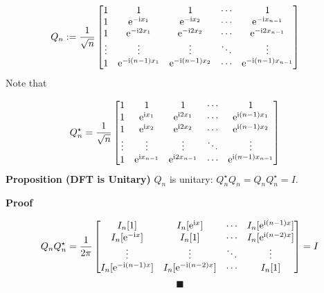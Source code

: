 \documentclass[12pt,a4paper]{article}
\begin{document}
\begin{align*}
Q_n &:= {1 \over \sqrt{n}} \begin{bmatrix} 1 & 1 & 1&  \ensuremath{\cdots} & 1 \\
                                    1 & {\rm e}^{-{\rm i} x_1} & {\rm e}^{-{\rm i} x_2} & \ensuremath{\cdots} & {\rm e}^{-{\rm i} x_{n-1}} \\
                                    1 & {\rm e}^{-{\rm i} 2 x_1} & {\rm e}^{-{\rm i} 2 x_2} & \ensuremath{\cdots} & {\rm e}^{-{\rm i} 2x_{n-1}} \\
                                    \ensuremath{\vdots} & \ensuremath{\vdots} & \ensuremath{\vdots} & \ensuremath{\ddots} & \ensuremath{\vdots} \\
                                    1 & {\rm e}^{-{\rm i} (n-1) x_1} & {\rm e}^{-{\rm i} (n-1) x_2} & \ensuremath{\cdots} & {\rm e}^{-{\rm i} (n-1) x_{n-1}}
\end{bmatrix} 
\end{align*}
Note that


\begin{align*}
Q_n^\ensuremath{\star} &= {1 \over \sqrt{n}} \begin{bmatrix}
1 & 1 & 1&  \ensuremath{\cdots} & 1 \\
1 & {\rm e}^{{\rm i} x_1} & {\rm e}^{{\rm i} 2 x_1} & \ensuremath{\cdots} & {\rm e}^{{\rm i} (n-1) x_1} \\
1 &  {\rm e}^{{\rm i} x_2}  & {\rm e}^{{\rm i} 2 x_2} & \ensuremath{\cdots} & {\rm e}^{{\rm i} (n-1)x_2} \\
\ensuremath{\vdots} & \ensuremath{\vdots} & \ensuremath{\vdots} & \ensuremath{\ddots} & \ensuremath{\vdots} \\
1 & {\rm e}^{{\rm i} x_{n-1}} & {\rm e}^{{\rm i} 2 x_{n-1}} & \ensuremath{\cdots} & {\rm e}^{{\rm i} (n-1) x_{n-1}}
\end{bmatrix} 
\end{align*}
\textbf{Proposition (DFT is Unitary)} $Q_n$ is unitary: $Q_n^\ensuremath{\star} Q_n = Q_n Q_n^\ensuremath{\star} = I$.

\textbf{Proof}

\[
Q_n Q_n^\ensuremath{\star}  = \frac{1}{2\pi}\begin{bmatrix} I_n[1] & I_n[{\rm e}^{{\rm i} x}] & \ensuremath{\cdots} & I_n[{\rm e}^{{\rm i} (n-1) x}] \\
                            I_n[{\rm e}^{-{\rm i} x}] & I_n[1] & \ensuremath{\cdots} & I_n[{\rm e}^{{\rm i} (n-2) x}] \\
                            \ensuremath{\vdots} & \ensuremath{\vdots} & \ensuremath{\ddots} & \ensuremath{\vdots} \\
                            I_n[{\rm e}^{-{\rm i}(n-1) x}] & I_n[{\rm e}^{-{\rm i}(n-2) x}] & \ensuremath{\cdots} & I_n[1]
                            \end{bmatrix} = I
\]
\[
\blacksquare
\]
\end{document}
